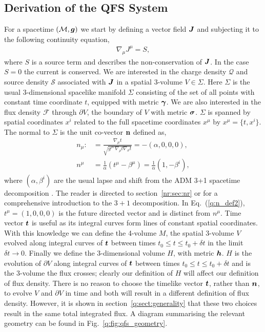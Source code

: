 \subsection{Derivation of the QFS System} \label{q:sect:derive}
For a spacetime $(\mathcal{M},\boldsymbol{g})$ we start by defining a vector field $\boldsymbol{J}$ and subjecting it to the following continuity equation,
\begin{align}
\label{q:continuity_eqn_def}\nabla_\mu J^\mu = S,
\end{align}
where $S$ is a source term and describes the non-conservation of $\boldsymbol{J}$. In the case $S=0$ the current is conserved. We are interested in the charge density $\mathcal{Q}$ and source density $\mathcal{S}$ associated with $\boldsymbol{J}$ in a spatial 3-volume $V\in\Sigma$. Here $\Sigma$ is the usual 3-dimensional spacelike manifold $\Sigma$ consisting of the set of all points with constant time coordinate $t$, equipped with metric $\boldsymbol{\gamma}$. We are also interested in the flux density $\mathcal{F}$ through $\partial V$, the boundary of $V$ with metric $\boldsymbol{\sigma}$. $\Sigma$ is spanned by spatial coordinates $x^i$ related to the full spacetime coordinates $x^\mu$ by $ x^\mu = \{t,x^i \}$. The normal to $\Sigma$ is the unit co-vector $\bf{n}$ defined as,
\begin{align}
\label{q:n_def}
n_\mu :&= \frac{\nabla_\mu t}{\sqrt{g^{\rho\sigma}\nabla_\rho t \nabla_\sigma t}} = -(\alpha,0,0,0), \\
\label{q:n_def2} n^\mu &= \frac{1}{\alpha}\left(t^\mu - \beta^\mu \right)= \frac{1}{\alpha} (1, -\beta^i ) ,
\end{align}
where $(\alpha,\beta^i)$ are the usual lapse and shift from the ADM 3+1 spacetime decomposition \cite{2008}. The reader is directed to section~\ref{nr:sec:nr} or \cite{gourgoulhon20073+} for a comprehensive introduction to the $3+1$ decomposition. In Eq.~(\ref{q:n_def2}), $t^\mu = (1,0,0,0)$ is the future directed vector and is distinct from $n^\mu$. Time vector $\boldsymbol{t}$ is useful as its integral curves form lines of constant spatial coordinates. With this knowledge we can define the 4-volume $M$, the spatial 3-volume $V$ evolved along integral curves of $\boldsymbol{t}$ between times $t_0\leq t\leq t_0 + \delta t$ in the limit $\delta t\rightarrow 0$. Finally we define the 3-dimensional volume $H$, with metric $\boldsymbol h$. $H$ is the evolution of $\partial V$ along integral curves of $\boldsymbol{t}$ between times $t_0\leq t \leq t_0 + \delta t$ and is the 3-volume the flux crosses; clearly our definition of $H$ will affect our definition of flux density. There is no reason to choose the timelike vector $\boldsymbol{t}$, rather than $\boldsymbol{n}$, to evolve $V$ and $\partial V$ in time and both will result in a different definition of flux density. However, it is shown in section~\ref{q:sect:generality} that these two choices result in the same total integrated flux. A diagram summarising the relevant geometry can be found in Fig.~\ref{q:fig:qfs_geometry}.

